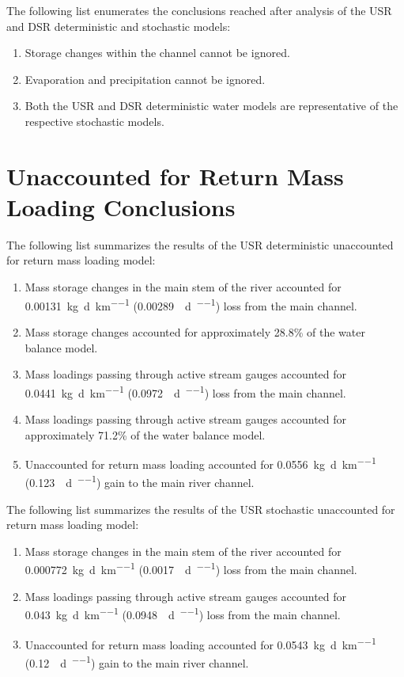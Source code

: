 The following list enumerates the conclusions reached after analysis of the USR and DSR deterministic and stochastic models:
\begin{enumerate}
	\item Storage changes within the channel cannot be ignored.
	\item Evaporation and precipitation cannot be ignored.
	\item Both the USR and DSR deterministic water models are representative of the respective stochastic models.
\end{enumerate}
\clearpage{}

\section{Unaccounted for Return Mass Loading Conclusions}
\label{sec:ReturnMassConclusions}

The following list summarizes the results of the USR deterministic unaccounted for return mass loading model:
\begin{enumerate}
	\item Mass storage changes in the main stem of the river accounted for \SI{0.00131}{\kilo\g\per\day\per\kilo\m} (\SI{0.00289}{\pound\per\day\per\mile}) loss from the main channel.
	\item Mass storage changes accounted for approximately 28.8\% of the water balance model.
	\item Mass loadings passing through active stream gauges accounted for \SI{0.0441}{\kilo\g\per\day\per\kilo\m} (\SI{0.0972}{\pound\per\day\per\mile}) loss from the main channel.
	\item Mass loadings passing through active stream gauges accounted for approximately 71.2\% of the water balance model.
	\item Unaccounted for return mass loading accounted for \SI{0.0556}{\kilo\g\per\day\per\kilo\m} (\SI{0.123}{\pound\per\day\per\mile}) gain to the main river channel.
\end{enumerate}

The following list summarizes the results of the USR stochastic unaccounted for return mass loading model:
\begin{enumerate}
	\item Mass storage changes in the main stem of the river accounted for \SI{0.000772}{\kilo\g\per\day\per\kilo\m} (\SI{0.0017}{\pound\per\day\per\mile}) loss from the main channel.
	\item Mass loadings passing through active stream gauges accounted for \SI{0.043}{\kilo\g\per\day\per\kilo\m} (\SI{0.0948}{\pound\per\day\per\mile}) loss from the main channel.
	\item Unaccounted for return mass loading accounted for \SI{0.0543}{\kilo\g\per\day\per\kilo\m} (\SI{0.12}{\pound\per\day\per\mile}) gain to the main river channel.
\end{enumerate}


